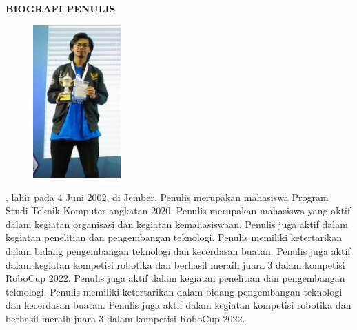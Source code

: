 \begin{center}
  \Large
  \textbf{BIOGRAFI PENULIS}
\end{center}


\vspace{2ex}

\begin{figure}
  \centering
  \vspace{-3ex}
  \includegraphics[width=0.3\textwidth]{gambar/foto_piala_asli_cropped.jpg}
  \vspace{-4ex}
\end{figure}

\name{}, lahir pada 4 Juni 2002, di Jember. Penulis merupakan mahasiswa Program Studi Teknik Komputer angkatan 2020. Penulis merupakan mahasiswa yang aktif dalam kegiatan organisasi dan kegiatan kemahasiswaan. Penulis juga aktif dalam kegiatan penelitian dan pengembangan teknologi. Penulis memiliki ketertarikan dalam bidang pengembangan teknologi dan kecerdasan buatan. Penulis juga aktif dalam kegiatan kompetisi robotika dan berhasil meraih juara 3 dalam kompetisi RoboCup 2022. Penulis juga aktif dalam kegiatan penelitian dan pengembangan teknologi. Penulis memiliki ketertarikan dalam bidang pengembangan teknologi dan kecerdasan buatan. Penulis juga aktif dalam kegiatan kompetisi robotika dan berhasil meraih juara 3 dalam kompetisi RoboCup 2022.
